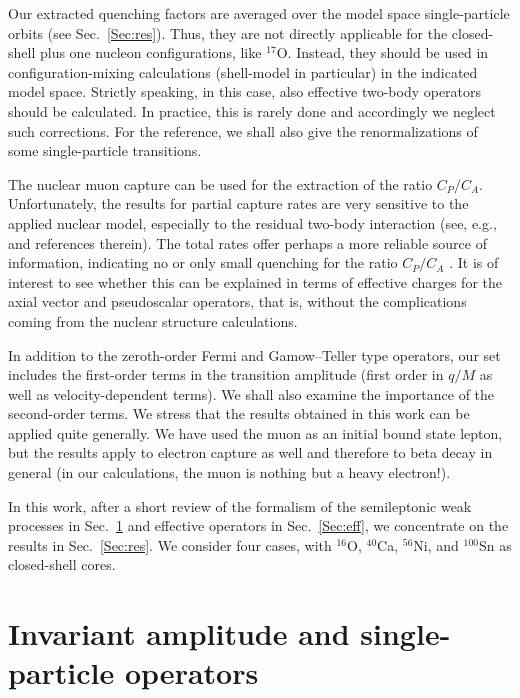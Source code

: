 Our extracted quenching factors are averaged over the model space
single-particle orbits
(see Sec.\ \ref{Sec:res}). Thus, they are not directly applicable for the
closed-shell plus one nucleon configurations, like $^{17}$O. Instead, they
should be used in configuration-mixing calculations (shell-model in
particular) in the indicated model space.
Strictly speaking, in this case, also effective two-body operators should
be calculated. In practice, this is rarely done and accordingly we neglect
such corrections. For the
reference, we shall also give the renormalizations of some single-particle
transitions.

The nuclear muon capture can be used for the extraction of the ratio $C_P/C_A$.
Unfortunately, the results for partial capture rates are very sensitive to 
the applied nuclear model, especially to the residual 
two-body interaction (see, e.g., \cite{sii98} and references therein). The
total rates offer perhaps a more reliable source of information, 
indicating no or only small quenching for the ratio $C_P/C_A$ \cite{kol94}. 
It is of interest to see
whether this can be explained in terms of effective charges for
the axial vector and pseudoscalar operators, that is, without the
complications coming from the nuclear structure calculations.

In addition to the zeroth-order Fermi and Gamow--Teller type operators, 
our set includes the first-order terms in the transition
amplitude (first order in $q/M$ as well as velocity-dependent terms).
We shall also examine the importance of the second-order terms.
We stress that the results obtained in this work can be applied quite
generally. We have used the muon as an initial bound state lepton, but the
results apply to electron capture as well and therefore to beta decay in
general (in our calculations, the muon is nothing but a heavy electron!).

In this work, after a short review of the formalism of the
semileptonic weak processes in Sec.\ \ref{Sec:ampl} and effective
operators in Sec.\ \ref{Sec:eff}, we concentrate on the results in Sec.\ 
\ref{Sec:res}. We consider four cases, with $^{16}$O, $^{40}$Ca, $^{56}$Ni, 
and $^{100}$Sn as closed-shell cores. 

\section{Invariant amplitude and single-particle operators}\label{Sec:ampl}

